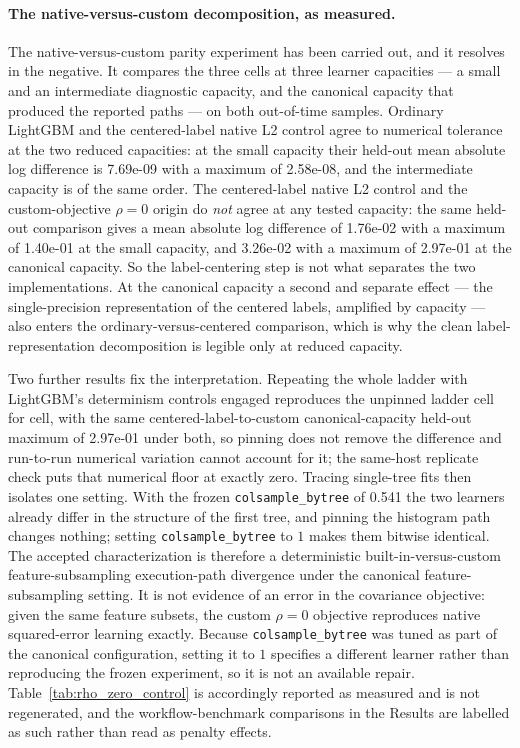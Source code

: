 \documentclass[10pt]{article}
\theoremstyle{definition}
\newcommand{\1}{\mathbf{1}}
\begin{document}
\paragraph{The native-versus-custom decomposition, as measured.} The native-versus-custom parity experiment has been
carried out, and it resolves in the negative. It compares the
three cells at three learner capacities --- a small and an intermediate diagnostic capacity, and the
canonical capacity that produced the reported paths --- on both out-of-time samples. Ordinary
LightGBM and the centered-label native L2 control agree to numerical tolerance at the two reduced
capacities: at the small capacity their held-out mean absolute log difference is 7.69e-09 with a
maximum of 2.58e-08, and the intermediate capacity is of the same order. The centered-label native
L2 control and the custom-objective $\rho=0$ origin do \emph{not} agree at any tested capacity: the
same held-out comparison gives a mean absolute log difference of 1.76e-02 with a maximum of
1.40e-01 at the small capacity, and 3.26e-02 with a maximum of 2.97e-01 at the canonical capacity.
So the label-centering step is not what separates the two implementations. At the canonical capacity
a second and separate effect --- the single-precision representation of the centered labels,
amplified by capacity --- also enters the ordinary-versus-centered comparison, which is why the
clean label-representation decomposition is legible only at reduced capacity.

Two further results fix the interpretation. Repeating the whole ladder with LightGBM's
determinism controls engaged reproduces the unpinned ladder cell for cell, with the same
centered-label-to-custom canonical-capacity held-out maximum of 2.97e-01 under both, so pinning
does not remove the difference and
run-to-run numerical variation cannot account for it; the same-host replicate check puts that
numerical floor at exactly zero. Tracing single-tree fits then isolates one setting. With the frozen
\texttt{colsample\_bytree} of 0.541 the two learners already differ in the structure of the first
tree, and pinning the histogram path changes nothing; setting \texttt{colsample\_bytree} to $1$ makes
them bitwise identical. The accepted characterization is therefore a deterministic
built-in-versus-custom feature-subsampling execution-path divergence under the canonical
feature-subsampling setting. It is not evidence of an error in the covariance objective: given the
same feature subsets, the custom $\rho=0$ objective reproduces native squared-error learning exactly.
Because \texttt{colsample\_bytree} was tuned as part of the canonical configuration, setting it to $1$
specifies a different learner rather than reproducing the frozen experiment, so it is not an
available repair. Table~\ref{tab:rho_zero_control} is accordingly reported as measured and is not
regenerated, and the workflow-benchmark comparisons in the Results are labelled as such rather than
read as penalty effects.
\end{document}

